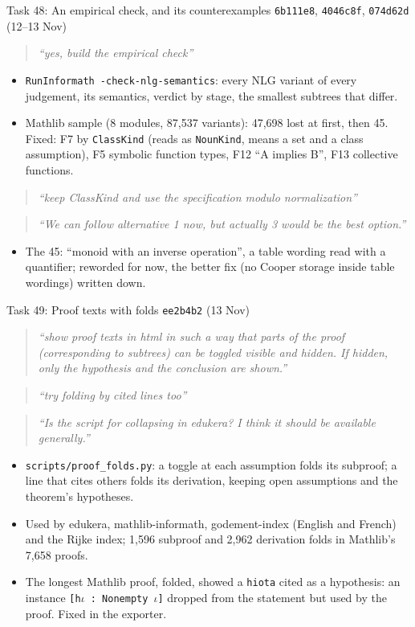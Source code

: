 \documentclass[10pt,aspectratio=169]{beamer}
\newcommand{\bad}[1]{\textcolor{warn}{#1}}
\newcommand{\ok}[1]{\textcolor{good}{#1}}
\newcommand{\commit}[1]{\texttt{\footnotesize #1}}
\newcommand{\prompt}[1]{\begin{quote}\small\itshape ``#1''\end{quote}}
\begin{document}
\begin{frame}{Task 48: An empirical check, and its counterexamples}
  \commit{6b111e8}, \commit{4046c8f}, \commit{074d62d} (12--13 Nov)
  \prompt{yes, build the empirical check}
  \begin{itemize}\small
    \item \texttt{RunInformath -check-nlg-semantics}: every NLG variant of every judgement,
          its semantics, verdict by stage, the smallest subtrees that differ.
    \item Mathlib sample (8 modules, 87,537 variants): \bad{47,698 lost} at first, then
          \ok{45}. Fixed: F7 by \texttt{ClassKind} (reads as \texttt{NounKind}, means a set
          and a class assumption), F5 symbolic function types, F12 ``A implies B'', F13
          collective functions.
  \end{itemize}
  \prompt{keep ClassKind and use the specification modulo normalization}
  \prompt{We can follow alternative 1 now, but actually 3 would be the best option.}
  \begin{itemize}\small
    \item The 45: ``monoid with \bad{an} inverse operation'', a table wording read with a
          quantifier; reworded for now, the better fix (no Cooper storage inside table
          wordings) written down.
  \end{itemize}
\end{frame}

\begin{frame}{Task 49: Proof texts with folds}
  \commit{ee2b4b2} (13 Nov)
  \prompt{show proof texts in html in such a way that parts of the proof (corresponding to
  subtrees) can be toggled visible and hidden. If hidden, only the hypothesis and the
  conclusion are shown.}
  \prompt{try folding by cited lines too}
  \prompt{Is the script for collapsing in edukera? I think it should be available generally.}
  \begin{itemize}\small
    \item \texttt{scripts/proof\_folds.py}: a toggle at each assumption folds its subproof; a
          line that cites others folds its derivation, keeping open assumptions and the
          theorem's hypotheses.
    \item Used by edukera, mathlib-informath, godement-index (English and French) and the
          Rijke index; 1,596 subproof and 2,962 derivation folds in Mathlib's 7,658 proofs.
    \item The longest Mathlib proof, folded, showed a \bad{\texttt{hiota}} cited as a hypothesis:
          an instance \texttt{[h$\iota$ : Nonempty $\iota$]} dropped from the statement but used by the
          proof. Fixed in the exporter.
  \end{itemize}
\end{frame}
\end{document}
